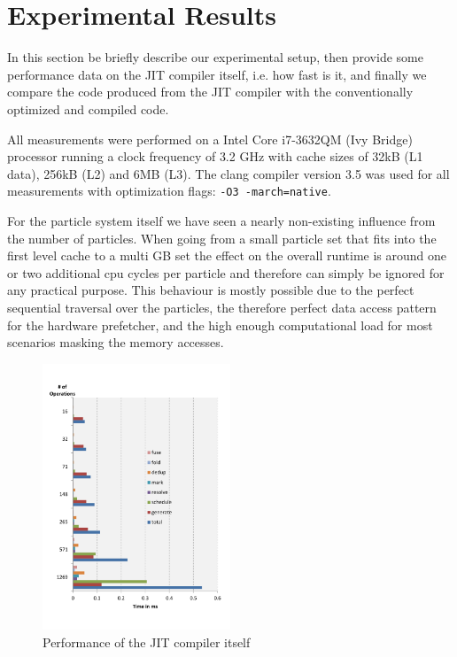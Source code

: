 \section{Experimental Results}\label{sec:exp}

In this section be briefly describe our experimental setup, then provide some performance data on the JIT compiler itself, i.e. how fast is it, and finally we compare the code produced from the JIT compiler with the conventionally optimized and compiled code.


All measurements were performed on a Intel Core i7-3632QM (Ivy Bridge) processor running a clock frequency of 3.2 GHz with cache sizes of 32kB (L1 data), 256kB (L2) and 6MB (L3). The clang compiler version 3.5 was used for all measurements with optimization flags: \texttt{-O3 -march=native}.

For the particle system itself we have seen a nearly non-existing influence from the number of particles. When going from a small particle set that fits into the first level cache to a multi GB set the effect on the overall runtime is around one or two additional cpu cycles per particle and therefore can simply be ignored for any practical purpose. This behaviour is mostly possible due to the perfect sequential traversal over the particles, the therefore perfect data access pattern for the hardware prefetcher, and the high enough computational load for most scenarios masking the memory accesses.



\begin{figure}[t]\centering
  \includegraphics[width=0.5\textwidth]{jit_perf.pdf}
  \caption{Performance of the JIT compiler itself
  \label{perf_jit}}
\end{figure}

